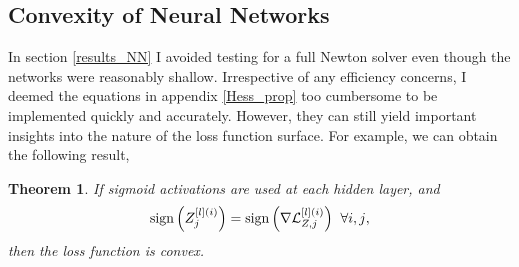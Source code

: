 \documentclass[nohyperref]{article}
\theoremstyle{plain}
\newtheorem{theorem}{Theorem}[section]
\theoremstyle{definition}
\theoremstyle{remark}
\DeclareMathOperator*{\sgn}{sign}
\begin{document}
\subsection{Convexity of Neural Networks}\label{app_convex}
In section \ref{results_NN} I avoided testing for a full Newton solver even though the networks were reasonably shallow. Irrespective of any efficiency concerns, I deemed the equations in appendix \ref{Hess_prop} too cumbersome to be implemented quickly and accurately. However, they can still yield important insights into the nature of the loss function surface. For example, we can obtain the following result,
\begin{theorem}
\label{thm:bigtheorem}
If sigmoid activations are used at each hidden layer, and
\begin{equation}
\sgn{\left(Z_j^{[l](i)}\right)}= \sgn{\left(\nabla \mathcal{L}^{[l](i)}_{Z,j} \right)} \hspace{0.2cm} \forall{i,j},
\end{equation}
then the loss function is convex.
\end{theorem}
\end{document}
